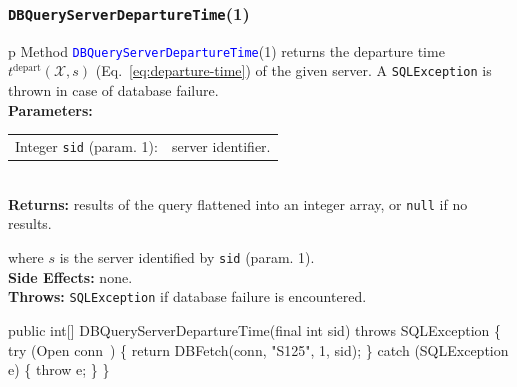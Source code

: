 \documentclass{article}
\def\nwendcode{\endtrivlist \endgroup}      %
\let\nwdocspar=\par
\theoremstyle{definition}                   %
\begin{document}
\subsubsection{{\tt{}\protect{}DBQueryServerDepartureTime}(1)}
\begin{tabular}{p{\textwidth}}
\toprule
{}
Method \textcolor{blue}{{\tt{}\protect{}DBQueryServerDepartureTime}}(1) returns the
departure time $t^\textrm{depart}(\mathcal{X},s)$
(Eq.~\ref{eq:departure-time}) of the given server.
A {\tt{}SQLException} is thrown in case of database failure.\\
\midrule
\textbf{Parameters:}\\
\begin{tabular}{lp{116mm}}
Integer {\tt{}sid} (param. 1):&server identifier.
\end{tabular}\\
\textbf{Returns:} results of the query flattened into an integer array,
or {\tt{}null} if no results.


where $s$ is the server identified by {\tt{}sid} (param. 1).\\
\textbf{Side Effects:} none.\\
\textbf{Throws:} {\tt{}SQLException} if database failure is encountered.\\
\bottomrule
\end{tabular}
\nwenddocs{}\plusendmoddef
public int[] DBQueryServerDepartureTime(final int sid) throws SQLException \{
  try (\LA{}Open \code{}conn\edoc{}~{\nwtagstyle{}}\RA{}) \{
    return DBFetch(conn, "S125", 1, sid);
  \} catch (SQLException e) \{
    throw e;
  \}
\}
\eatline
{}\nwendcode{}\nwdocspar
\end{document}
